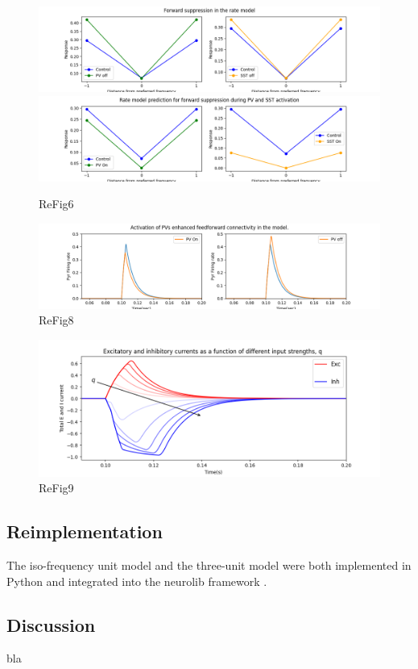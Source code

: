 \begin{figure}
 \includegraphics[width=\textwidth]{Figures/Fig6BC}
 \includegraphics[width=\textwidth]{Figures/Fig6DE}
 \caption{ReFig6}
\end{figure}

\begin{figure}
 \includegraphics[width=\textwidth]{Figures/Fig8BD}
 \caption{ReFig8}
\end{figure}

\begin{figure}
 \includegraphics[width=\textwidth]{Figures/Fig9}
 \caption{ReFig9}
\end{figure}


\subsection{Reimplementation}
The iso-frequency unit model and the three-unit model were both implemented in Python and integrated into the neurolib framework 
\supercite{cakan2019neurolib}.


 




\subsection{Discussion}
bla

